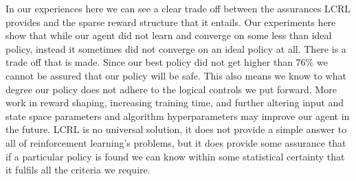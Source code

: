 \documentclass{article}
\begin{document}
In our experiences here we can see a clear trade off between the assurances LCRL provides and the sparse reward structure that it entails. Our experiments here show that while our agent did not learn and converge on some less than ideal policy, instead it sometimes did not converge on an ideal policy at all. There is a trade off that is made. Since our best policy did not get higher than 76\% we cannot be assured that our policy will be safe. This also means we know to what degree our policy does not adhere to the logical controls we put forward. More work in reward shaping, increasing training time, and further altering input and state space parameters and algorithm hyperparameters may improve our agent in the future. LCRL is no universal solution, it does not provide a simple answer to all of reinforcement learning's problems, but it does provide some assurance that if a particular policy is found we can know within some statistical certainty that it fulfils all the criteria we require.


\printbibliography %
\end{document}
